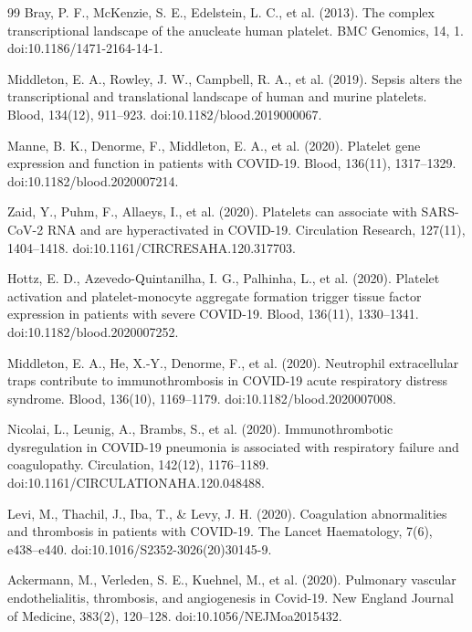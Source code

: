 \documentclass[11pt,a4paper]{article}
\begin{document}
\begin{thebibliography}{99}
Bray, P. F., McKenzie, S. E., Edelstein, L. C., et al. (2013).
\newblock The complex transcriptional landscape of the anucleate human platelet.
\newblock BMC Genomics, 14, 1. doi:10.1186/1471-2164-14-1.

Middleton, E. A., Rowley, J. W., Campbell, R. A., et al. (2019).
\newblock Sepsis alters the transcriptional and translational landscape of human and murine platelets.
\newblock Blood, 134(12), 911--923. doi:10.1182/blood.2019000067.

Manne, B. K., Denorme, F., Middleton, E. A., et al. (2020).
\newblock Platelet gene expression and function in patients with COVID-19.
\newblock Blood, 136(11), 1317--1329. doi:10.1182/blood.2020007214.

Zaid, Y., Puhm, F., Allaeys, I., et al. (2020).
\newblock Platelets can associate with SARS-CoV-2 RNA and are hyperactivated in COVID-19.
\newblock Circulation Research, 127(11), 1404--1418. doi:10.1161/CIRCRESAHA.120.317703.

Hottz, E. D., Azevedo-Quintanilha, I. G., Palhinha, L., et al. (2020).
\newblock Platelet activation and platelet-monocyte aggregate formation trigger tissue factor expression in patients with severe COVID-19.
\newblock Blood, 136(11), 1330--1341. doi:10.1182/blood.2020007252.

Middleton, E. A., He, X.-Y., Denorme, F., et al. (2020).
\newblock Neutrophil extracellular traps contribute to immunothrombosis in COVID-19 acute respiratory distress syndrome.
\newblock Blood, 136(10), 1169--1179. doi:10.1182/blood.2020007008.

Nicolai, L., Leunig, A., Brambs, S., et al. (2020).
\newblock Immunothrombotic dysregulation in COVID-19 pneumonia is associated with respiratory failure and coagulopathy.
\newblock Circulation, 142(12), 1176--1189. doi:10.1161/CIRCULATIONAHA.120.048488.

Levi, M., Thachil, J., Iba, T., \& Levy, J. H. (2020).
\newblock Coagulation abnormalities and thrombosis in patients with COVID-19.
\newblock The Lancet Haematology, 7(6), e438--e440. doi:10.1016/S2352-3026(20)30145-9.

Ackermann, M., Verleden, S. E., Kuehnel, M., et al. (2020).
\newblock Pulmonary vascular endothelialitis, thrombosis, and angiogenesis in Covid-19.
\newblock New England Journal of Medicine, 383(2), 120--128. doi:10.1056/NEJMoa2015432.


\end{thebibliography}
\end{document}
